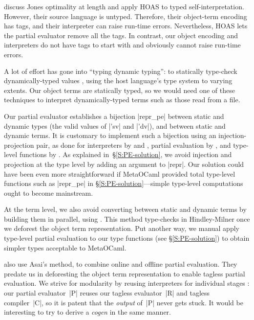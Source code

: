 \citet{Danvy-tagging-encoding} discuss Jones optimality at length and
apply HOAS to typed self\hyp interpretation.  However, their source
language is untyped.  Therefore, their object\hyp term encoding has
tags, and their interpreter can raise run-time errors.
Nevertheless, HOAS lets the partial
evaluator remove all the tags. In contrast, our object encoding and
interpreters do not have tags to start with and obviously cannot
raise run-time errors.

\ifshort\else
A lot of effort has gone into ``typing dynamic typing'': to statically
type-check dynamically\hyp typed values
\citep{baars-typing,WalidICFP02,Guillemette-Monier-PLPV,haskell-list},
using the host language's type system to varying extents.
Our object terms are statically typed, so we would
need one of these techniques to interpret dynamically\hyp typed
terms such as those read from a file.
\fi

Our partial evaluator establishes a bijection |repr_pe| between static
and dynamic types (the valid values of |'sv| and |'dv|), and between
static and dynamic terms.  It is customary to implement such a bijection
using an injection\hyp projection pair, as done for interpreters
\ifshort \citep{Ramsey-ML-module-mania,Benton-embedded-interpreters}\else
by \citet{Ramsey-ML-module-mania} and \citet{Benton-embedded-interpreters}\fi,
partial evaluation \ifshort \citep{Danvy-TDPE}\else by \citet{Danvy-TDPE}\fi,
and type-level functions \ifshort \citep{oliveira-typecase}\else by
\citet{oliveira-typecase}\fi.  As explained in~\S\ref{S:PE-solution}, we
avoid injection and projection at the type level by adding an argument
to |repr|.
Our solution could have been even more straightforward if MetaOCaml
provided total type-level functions such as |repr_pe| in
\S\ref{S:PE-solution}---simple type-level computations 
ought to become mainstream.

At the term level, we also avoid converting between static and dynamic
terms by building them in parallel, using \citet{asai-binding-time}.
This method type-checks in Hindley-Milner once we
deforest the object term representation.  Put another way, we
manual apply type-level partial evaluation to our type
functions (see \S\ref{S:PE-solution}) to obtain simpler types 
acceptable to MetaOCaml.

 also use Asai's method,
to combine online
and offline partial evaluation.
They predate us in deforesting the object term representation to enable tagless
partial evaluation.
We strive for modularity by reusing interpreters for individual stages
\citep{SperberThiemann:TwoForOne}: our partial evaluator~|P|
reuses our tagless evaluator~|R| and tagless compiler~|C|, so it
is patent that the \emph{output} of~|P| never gets
stuck.  It would be interesting
to try to derive a \emph{cogen} \citep{Thiemann:cogeninsixlines}
in the same manner.

